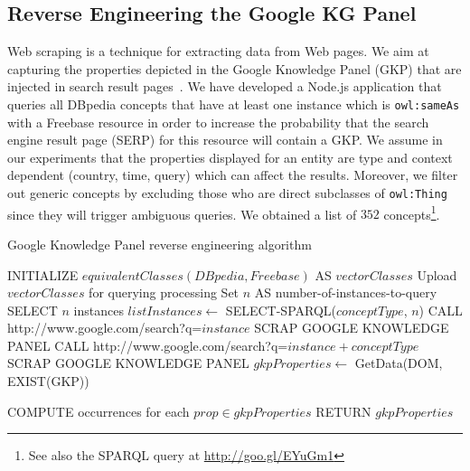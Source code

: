\subsection{Reverse Engineering the Google KG Panel}
\label{sec:knowledge-graph}
Web scraping is a technique for extracting data from Web pages. We aim at capturing the properties depicted in the Google Knowledge Panel (GKP) that are injected in search result pages~\cite{Bergman2012}. We have developed a Node.js application that queries all DBpedia concepts that have at least one instance which is \texttt{owl:sameAs} with a Freebase resource in order to increase the probability that the search engine result page (SERP) for this resource will contain a GKP. We assume in our experiments that the properties displayed for an entity are type and context dependent (country, time, query) which can affect the results. Moreover, we filter out generic concepts by excluding those who are direct subclasses of \texttt{owl:Thing} since they will trigger ambiguous queries. We obtained a list of $352$ concepts\footnote{See also the SPARQL query at \url{http://goo.gl/EYuGm1}}.

\begin{algorithm}[h]
\scriptsize
\caption{Google Knowledge Panel reverse engineering algorithm} \label{algoscrapping}
\begin{algorithmic}[1]
    \STATE INITIALIZE $equivalentClasses(DBpedia,Freebase) $ AS $vectorClasses$
    \STATE Upload $vectorClasses$ for querying processing
    \STATE Set $n$ AS number-of-instances-to-query
	\STATE SELECT $n$ instances
	\STATE $listInstances \leftarrow$ SELECT-SPARQL($conceptType$, $n$)
			\STATE CALL http://www.google.com/search?q=$instance$
				\STATE SCRAP GOOGLE KNOWLEDGE PANEL
			\ELSE
				\STATE CALL http://www.google.com/search?q=$instance + conceptType$
 				\STATE SCRAP GOOGLE KNOWLEDGE PANEL
			\ENDIF
			\STATE $gkpProperties \leftarrow$ GetData(DOM, EXIST(GKP))
			
		\ENDFOR
	\STATE COMPUTE occurrences for each $prop \in gkpProperties$
    \ENDFOR
    \STATE RETURN $gkpProperties$
\end{algorithmic}

\end{algorithm}



